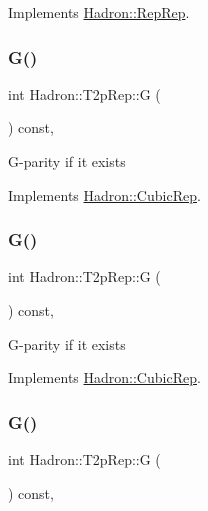 Implements \mbox{\hyperlink{structHadron_1_1RepRep_a92c8802e5ed7afd7da43ccfd5b7cd92b}{Hadron\+::\+Rep\+Rep}}.

\mbox{\label{structHadron_1_1T2pRep_a7feb263c3f7e0afe1c8beda96f62988e}} 
\subsubsection{\texorpdfstring{G()}{G()}\hspace{0.1cm}{\footnotesize\ttfamily [1/3]}}
{\footnotesize\ttfamily int Hadron\+::\+T2p\+Rep\+::G (\begin{DoxyParamCaption}{ }\end{DoxyParamCaption}) const\hspace{0.3cm}{\ttfamily [inline]}, {\ttfamily [virtual]}}

G-\/parity if it exists 

Implements \mbox{\hyperlink{structHadron_1_1CubicRep_a52104e43266d1614c00bbd1c3b395458}{Hadron\+::\+Cubic\+Rep}}.

\mbox{\label{structHadron_1_1T2pRep_a7feb263c3f7e0afe1c8beda96f62988e}} 
\subsubsection{\texorpdfstring{G()}{G()}\hspace{0.1cm}{\footnotesize\ttfamily [2/3]}}
{\footnotesize\ttfamily int Hadron\+::\+T2p\+Rep\+::G (\begin{DoxyParamCaption}{ }\end{DoxyParamCaption}) const\hspace{0.3cm}{\ttfamily [inline]}, {\ttfamily [virtual]}}

G-\/parity if it exists 

Implements \mbox{\hyperlink{structHadron_1_1CubicRep_a52104e43266d1614c00bbd1c3b395458}{Hadron\+::\+Cubic\+Rep}}.

\mbox{\label{structHadron_1_1T2pRep_a7feb263c3f7e0afe1c8beda96f62988e}} 
\subsubsection{\texorpdfstring{G()}{G()}\hspace{0.1cm}{\footnotesize\ttfamily [3/3]}}
{\footnotesize\ttfamily int Hadron\+::\+T2p\+Rep\+::G (\begin{DoxyParamCaption}{ }\end{DoxyParamCaption}) const\hspace{0.3cm}{\ttfamily [inline]}, {\ttfamily [virtual]}}

